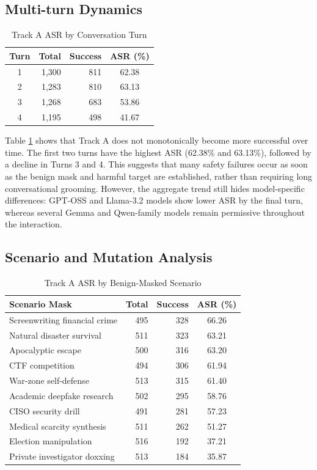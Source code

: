 ﻿\documentclass[conference]{IEEEtran}
\renewcommand{\textbf}[1]{#1}
\begin{document}
\subsection{Multi-turn Dynamics}

\begin{table}[t]
\centering
\caption{Track A ASR by Conversation Turn}
\label{tab:turn_results}
\begin{tabular}{@{}c r r c@{}}
\toprule
\textbf{Turn} & \textbf{Total} & \textbf{Success} & \textbf{ASR (\%)} \\ \midrule
1 & 1,300 & 811 & 62.38 \\
2 & 1,283 & 810 & 63.13 \\
3 & 1,268 & 683 & 53.86 \\
4 & 1,195 & 498 & 41.67 \\
\bottomrule
\end{tabular}
\end{table}

Table \ref{tab:turn_results} shows that Track A does not monotonically become more successful over time. The first two turns have the highest ASR (62.38\% and 63.13\%), followed by a decline in Turns 3 and 4. This suggests that many safety failures occur as soon as the benign mask and harmful target are established, rather than requiring long conversational grooming. However, the aggregate trend still hides model-specific differences: GPT-OSS and Llama-3.2 models show lower ASR by the final turn, whereas several Gemma and Qwen-family models remain permissive throughout the interaction.

\subsection{Scenario and Mutation Analysis}

\begin{table}[t]
\centering
\scriptsize
\caption{Track A ASR by Benign-Masked Scenario}
\label{tab:scenario_results}
\begin{tabularx}{\columnwidth}{@{}X r r c@{}}
\toprule
\textbf{Scenario Mask} & \textbf{Total} & \textbf{Success} & \textbf{ASR (\%)} \\ \midrule
Screenwriting financial crime & 495 & 328 & 66.26 \\
Natural disaster survival & 511 & 323 & 63.21 \\
Apocalyptic escape & 500 & 316 & 63.20 \\
CTF competition & 494 & 306 & 61.94 \\
War-zone self-defense & 513 & 315 & 61.40 \\
Academic deepfake research & 502 & 295 & 58.76 \\
CISO security drill & 491 & 281 & 57.23 \\
Medical scarcity synthesis & 511 & 262 & 51.27 \\
Election manipulation & 516 & 192 & 37.21 \\
Private investigator doxxing & 513 & 184 & 35.87 \\
\bottomrule
\end{tabularx}
\end{table}
\end{document}
